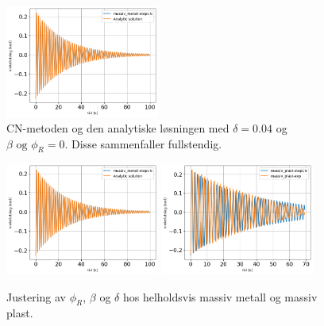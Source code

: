 \documentclass[5p]{elsarticle}
\begin{document}
\begin{figure}[p] 
	\begin{center}
		\includegraphics[width=0.45\textwidth]{img/massiv_metall-stepCN.png}
  
 \end{center}
	\caption{CN-metoden og den analytiske løsningen med \(\delta = 0.04\) og \(\beta \text{ og } \phi_R = 0\). Disse sammenfaller fullstendig.}
	\label{Fig CN} %
\end{figure}

\begin{figure}[p] 
	\begin{center}
            \includegraphics[width=0.45\textwidth]{img/massiv_metall-stepCN.png}
		\includegraphics[width=0.45\textwidth]{img/massiv_plast-stepCN copy.png}
 \end{center}
	\caption{Justering av \(\phi_R\), \(\beta\) og \(\delta\) hos helholdsvis massiv metall og massiv plast.}
	\label{Fig tweaking} %
\end{figure}
\end{document}
